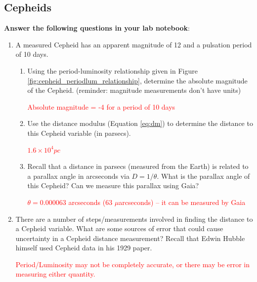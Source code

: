 \documentclass[11pt]{article}
\begin{document}

\subsection{Cepheids}\label{sec:cepheids}

\textbf{Answer the following questions in your lab notebook}:

\begin{enumerate}
    \item [10 pts] A measured Cepheid has an apparent magnitude of 12 and a pulsation period of 10 days. 
    \begin{enumerate}
        \item Using the period-luminosity relationship given in Figure \ref{fig:cepheid_periodlum_relationship}, determine the absolute magnitude of the Cepheid. (reminder: magnitude measurements don't have units)
        
        \textcolor{red}{Absolute magnitude = -4 for a period of 10 days}
        
        \item Use the distance modulus (Equation \ref{eq:dm}) to determine the distance to this Cepheid variable (in parsecs).
        
        \textcolor{red}{$1.6 \times 10^4 pc$}
        
        \item Recall that a distance in parsecs (measured from the Earth) is related to a parallax angle in arcseconds via $D = 1/\theta$. What is the parallax angle of this Cepheid? Can we measure this parallax using Gaia?
        
        \textcolor{red}{$\theta = 0.000063$ arcseconds (63 $\mu$arcseconds) -- it can be measured by Gaia}
    \end{enumerate} 
    
    
    \item [4 pts] There are a number of steps/measurements involved in finding the distance to a Cepheid variable. What are some sources of error that could cause uncertainty in a Cepheid distance measurement? Recall that Edwin Hubble himself used Cepheid data in his 1929 paper.
    
    \textcolor{red}{Period/Luminosity may not be completely accurate, or there may be error in measuring either quantity.}
\end{enumerate}
\end{document}
